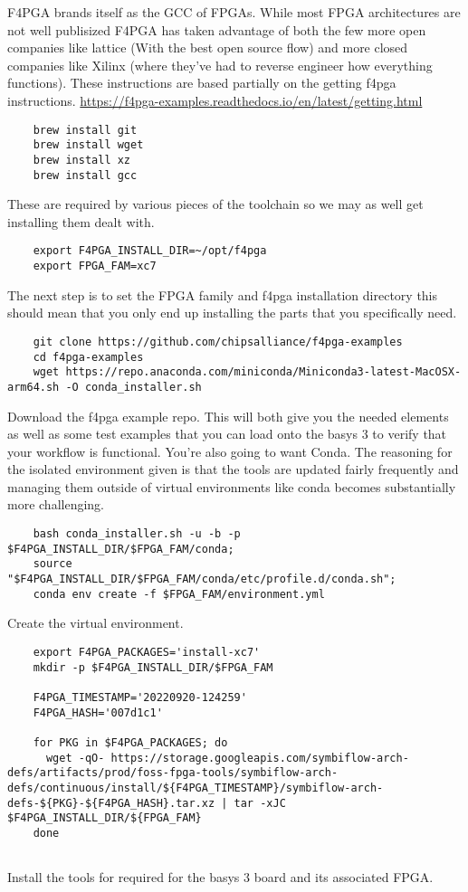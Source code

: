 F4PGA brands itself as the GCC of FPGAs. 
While most FPGA architectures are not well publisized F4PGA has taken advantage of both the few more open companies like lattice 
(With the best open source flow) and more closed companies like Xilinx (where they've had to reverse engineer how everything functions).
These instructions are based partially on the getting f4pga instructions. \href{https://f4pga-examples.readthedocs.io/en/latest/getting.html}{https://f4pga-examples.readthedocs.io/en/latest/getting.html}
\begin{verbatim}
    brew install git
    brew install wget
    brew install xz
    brew install gcc
\end{verbatim}

These are required by various pieces of the toolchain so we may as well get installing them dealt with.

\begin{verbatim}
    export F4PGA_INSTALL_DIR=~/opt/f4pga
    export FPGA_FAM=xc7
\end{verbatim}

The next step is to set the FPGA family and f4pga installation directory this should mean that you only end up installing the parts that you specifically need.

\begin{verbatim}
    git clone https://github.com/chipsalliance/f4pga-examples
    cd f4pga-examples
    wget https://repo.anaconda.com/miniconda/Miniconda3-latest-MacOSX-arm64.sh -O conda_installer.sh
\end{verbatim}

Download the f4pga example repo. This will both give you the needed elements as well as some test examples that you can load onto the basys 3 to verify that your workflow is functional.
You're also going to want Conda. The reasoning for the isolated environment given is that the tools are updated fairly frequently and managing them outside of virtual environments like conda becomes substantially more challenging.

\begin{verbatim}
    bash conda_installer.sh -u -b -p $F4PGA_INSTALL_DIR/$FPGA_FAM/conda;
    source "$F4PGA_INSTALL_DIR/$FPGA_FAM/conda/etc/profile.d/conda.sh";
    conda env create -f $FPGA_FAM/environment.yml    
\end{verbatim}

Create the virtual environment. 

\begin{verbatim}
    export F4PGA_PACKAGES='install-xc7'
    mkdir -p $F4PGA_INSTALL_DIR/$FPGA_FAM

    F4PGA_TIMESTAMP='20220920-124259'
    F4PGA_HASH='007d1c1'
    
    for PKG in $F4PGA_PACKAGES; do
      wget -qO- https://storage.googleapis.com/symbiflow-arch-defs/artifacts/prod/foss-fpga-tools/symbiflow-arch-defs/continuous/install/${F4PGA_TIMESTAMP}/symbiflow-arch-defs-${PKG}-${F4PGA_HASH}.tar.xz | tar -xJC $F4PGA_INSTALL_DIR/${FPGA_FAM}
    done
    
\end{verbatim}

Install the tools for required for the basys 3 board and its associated FPGA.